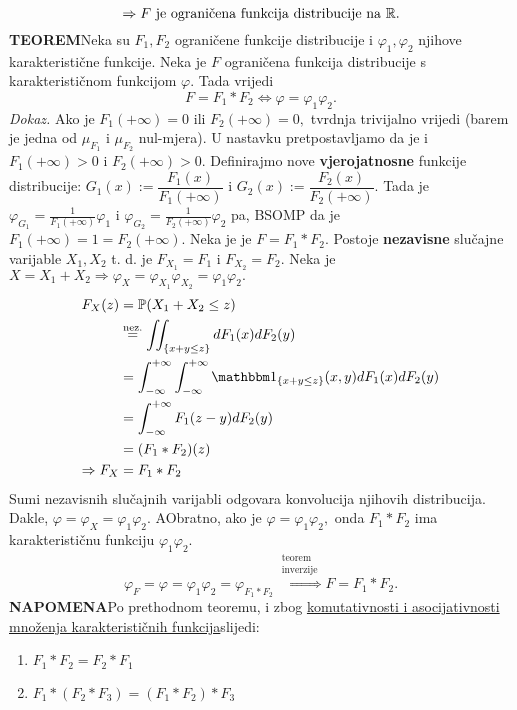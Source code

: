 \documentclass{article}
\begin{document}
\[\Rightarrow F\text{ je ograničena funkcija distribucije na }\Bbb R.\] 
\textbf{TEOREM}\newline Neka su \(F_1,F_2\) ograničene funkcije distribucije i \(\varphi_1,\varphi_2\) njihove karakteristične funkcije. \newline Neka je \(F\) ograničena funkcija distribucije s karakterističnom funkcijom \(\varphi.\) Tada vrijedi \[F=F_1*F_2\Leftrightarrow\varphi=\varphi_1\varphi_2.\]
\textit{Dokaz.}\newline
Ako je \(F_1(+\infty)=0\) ili \(F_2(+\infty)=0,\) tvrdnja trivijalno vrijedi (barem je jedna od \(\mu_{F_1}\) i \(\mu_{F_2}\) nul-mjera). U nastavku pretpostavljamo da je i \(F_1(+\infty)>0\) i \(F_2(+\infty)>0.\) Definirajmo nove \textbf{vjerojatnosne} funkcije distribucije: \(G_1(x):=\dfrac{F_1(x)}{F_1(+\infty)}\) i \(G_2(x):=\dfrac{F_2(x)}{F_2(+\infty)}.\) Tada je \(\varphi_{G_1}=\frac1{F_1(+\infty)}\varphi_1\) i \(\varphi_{G_2}=\frac1{F_2(+\infty)}\varphi_2\) pa, BSOMP da je \(F_1(+\infty)=1=F_2(+\infty).\) Neka je je \(F=F_1*F_2.\) Postoje \textbf{nezavisne} slučajne varijable \(X_1,X_2\) t. d. je \(F_{X_1}=F_1\) i \(F_{X_2}=F_2.\) Neka je \(X=X_1+X_2\Rightarrow \varphi_X=\varphi_{X_1}\varphi_{X_2}=\varphi_1\varphi_2.\) \[\begin{aligned}F_X(z)&=\Bbb P(X_1+X_2\le z)\\&\overset{\text{nez.}}{=}\iint_{\{x+y\le z\}}dF_1(x)dF_2(y)\\&=\int_{-\infty}^{+\infty}\int_{-\infty}^{+\infty}\mathbbm 1_{\{x+y\le z\}}(x,y)dF_1(x)dF_2(y)\\&=\int_{-\infty}^{+\infty}F_1(z-y)dF_2(y)\\&=(F_1*F_2)(z)\\\Rightarrow F_X&=F_1*F_2\end{aligned}\] Sumi nezavisnih slučajnih varijabli odgovara konvolucija njihovih distribucija. Dakle, \(\varphi=\varphi_X=\varphi_1\varphi_2.\) A\newline Obratno, ako je \(\varphi=\varphi_1\varphi_2,\) onda \(F_1*F_2\) ima karakterističnu funkciju \(\varphi_1\varphi_2.\)    \[\varphi_F=\varphi=\varphi_1\varphi_2=\varphi_{F_1*F_2}\overset{\substack{\text{teorem}\\\text{inverzije}}}{\Rightarrow} F=F_1*F_2.\] 
\textbf{NAPOMENA}\newline Po prethodnom teoremu, i zbog \underline{komutativnosti i asocijativnosti množenja karakterističnih funkcija}\newline slijedi:
\begin{enumerate}
    \item[] \(F_1*F_2=F_2*F_1\)
    \item[] \(F_1*(F_2*F_3)=(F_1*F_2)*F_3\)
\end{enumerate}
\end{document}
